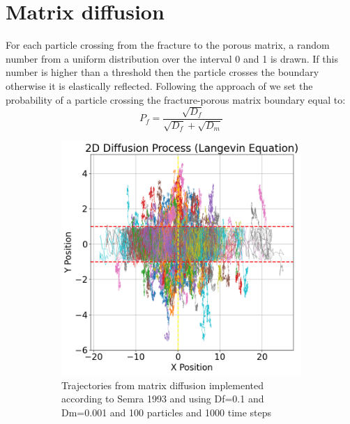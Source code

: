 \documentclass{article}
\begin{document}
\section{Matrix diffusion}
For each particle crossing from the fracture to the porous matrix, a random number from a uniform distribution over the interval 0 and 1 is drawn. If this number is higher than a threshold then the particle crosses the boundary otherwise it is elastically reflected. Following the approach of \cite{salamon2006review} we set the probability of a particle crossing the fracture-porous matrix boundary equal to:
\begin{equation}
    P_f = \frac{\sqrt{D_f}}{\sqrt{D_f}+\sqrt{D_m}}
    \label{eq:Salamon}
\end{equation}
\begin{figure}[htbp]
    \centering
    \begin{subfigure}[b]{0.45\textwidth}
        \centering
        \includegraphics[width=\textwidth]{images/trajectoriesMatrixDiffusion.png}
        \caption{Trajectories from matrix diffusion implemented according to Semra 1993 and using Df=0.1 and Dm=0.001 and 100 particles and 1000 time steps}
        \label{fig:MatDiff}
    \end{subfigure}
    \hfill
    \begin{subfigure}[b]{0.45\textwidth}
        \centering

\end{subfigure}
\end{figure}
\end{document}
